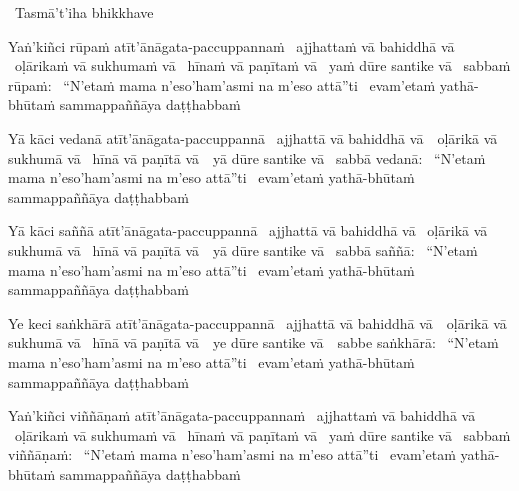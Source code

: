 \begin{leader-pali}
  \anglebracketleft\ \hspace{-0.5mm}Tasmā't'iha bhikkhave \hspace{-0.5mm}\anglebracketright\
\end{leader-pali}
\begin{pali-hang-together}
  Yaṅ'kiñci rūpaṁ atīt'ānāgata-paccuppannaṁ \breathmark\ ajjhattaṁ vā bahiddhā vā \breathmark\ oḷārikaṁ vā sukhumaṁ vā \breathmark\ hīnaṁ vā paṇītaṁ vā \breathmark\ yaṁ dūre santike vā \breathmark\ sabbaṁ rūpaṁ: \breathmark\ ``N'etaṁ mama n'eso'ham'asmi na m'eso attā''ti \breathmark\ evam'etaṁ yathā-bhūtaṁ sammappaññāya daṭṭhabbaṁ
\end{pali-hang-together}

\begin{pali-hang}
  Yā kāci vedanā atīt'ānāgata-paccuppannā \breathmark\ ajjhattā vā bahiddhā \mbox{vā}~\breathmark\ oḷārikā vā sukhumā vā \breathmark\ hīnā vā paṇītā \mbox{vā}~\breathmark\ yā dūre santike vā \breathmark\ sabbā vedanā: \breathmark\ ``N'etaṁ mama n'eso'ham'asmi na m'eso attā''ti \breathmark\ evam'etaṁ yathā-bhūtaṁ sammappaññāya daṭṭhabbaṁ
\end{pali-hang}

\begin{pali-hang}
  Yā kāci saññā atīt'ānāgata-paccuppannā \breathmark\ ajjhattā vā bahiddhā vā \breathmark\ oḷārikā vā sukhumā vā \breathmark\ hīnā vā paṇītā \mbox{vā}~\breathmark\ yā dūre santike vā \breathmark\ sabbā saññā: \breathmark\ ``N'etaṁ mama n'eso'ham'asmi na m'eso attā''ti \breathmark\ evam'etaṁ yathā-bhūtaṁ sammappaññāya daṭṭhabbaṁ
\end{pali-hang}

\begin{pali-hang}
  Ye keci saṅkhārā atīt'ānāgata-paccuppannā \breathmark\ ajjhattā vā bahiddhā \mbox{vā}~\breathmark\ oḷārikā vā sukhumā vā \breathmark\ hīnā vā paṇītā \mbox{vā}~\breathmark\ ye dūre santike \mbox{vā}~\breathmark\ sabbe saṅkhārā: \breathmark\ ``N'etaṁ mama n'eso'ham'asmi na m'eso attā''ti \breathmark\ evam'etaṁ yathā-bhūtaṁ sammappaññāya daṭṭhabbaṁ
\end{pali-hang}

\begin{pali-hang}
  Yaṅ'kiñci viññāṇaṁ atīt'ānāgata-paccuppannaṁ \breathmark\ ajjhattaṁ vā bahiddhā vā \breathmark\ oḷārikaṁ vā sukhumaṁ vā \breathmark\ hīnaṁ vā paṇītaṁ vā \breathmark\ yaṁ dūre santike vā \breathmark\ sabbaṁ viññāṇaṁ: \breathmark\ ``N'etaṁ mama n'eso'ham'asmi na m'eso attā''ti \breathmark\ evam'etaṁ yathā-bhūtaṁ sammappaññāya daṭṭhabbaṁ
\end{pali-hang}

